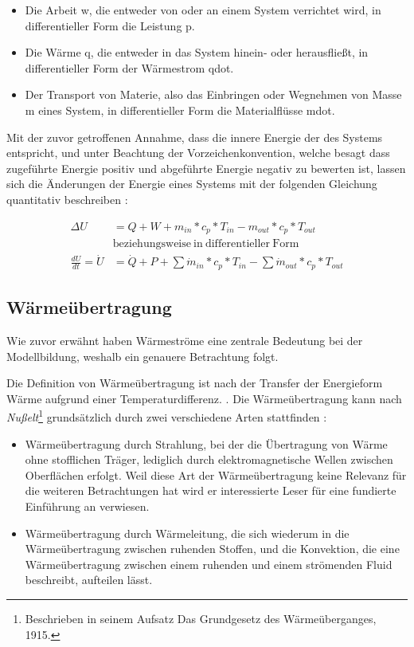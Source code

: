 \begin{itemize}
	\item Die Arbeit \gls{w}, die entweder von oder an einem System verrichtet wird, in differentieller Form die Leistung \gls{p}.
	\item Die Wärme \gls{q}, die entweder in das System hinein- oder herausfließt, in differentieller Form der Wärmestrom \gls{qdot}.
	\item Der Transport von Materie, also das Einbringen oder Wegnehmen von Masse \gls{m} eines System, in differentieller Form die Materialflüsse \gls{mdot}.
\end{itemize}

Mit der zuvor getroffenen Annahme, dass die innere Energie der des Systems entspricht, und unter Beachtung der Vorzeichenkonvention, welche besagt dass zugeführte Energie positiv und abgeführte Energie negativ zu bewerten ist, lassen sich die Änderungen der Energie eines Systems mit der folgenden Gleichung quantitativ beschreiben \cite[S.~54]{ba12}:

\begin{equation}
\label{eq:hauptsatz}
\begin{split}
\Delta U & = Q + W + m_{in}*c_{p}*T_{in}-m_{out}*c_{p}*T_{out} \\ ~& \mathrm{beziehungsweise~in~differentieller~Form}\\
\frac{dU}{dt}=\dot{U} & =\dot{Q}+P+\sum\dot{m}_{in}*c_{p}*T_{in}-\sum\dot{m}_{out}*c_{p}*T_{out}
\end{split}
\end{equation}


\subsection{Wärmeübertragung}

Wie zuvor erwähnt haben Wärmeströme eine zentrale Bedeutung bei der Modellbildung, weshalb ein genauere Betrachtung folgt.

Die Definition von Wärmeübertragung ist nach \cite[S.~1]{bo14} \Gun [...] der Transfer der Energieform Wärme aufgrund einer Temperaturdifferenz. \Gun .
Die Wärmeübertragung kann nach \textit{Nußelt}\footnote{Beschrieben in seinem Aufsatz \Gun Das Grundgesetz des Wärmeüberganges\Gob , 1915.} grundsätzlich durch zwei verschiedene Arten stattfinden \cite[S.~3f.]{bo14}:

\begin{itemize}
	\item Wärmeübertragung durch Strahlung, bei der die Übertragung von Wärme ohne stofflichen Träger, lediglich durch elektromagnetische Wellen zwischen Oberflächen erfolgt. Weil diese Art der Wärmeübertragung keine Relevanz für die weiteren Betrachtungen hat wird er interessierte Leser für eine fundierte Einführung an \cite{bo14} verwiesen. 
	\item  Wärmeübertragung durch Wärmeleitung, die sich wiederum in die Wärmeübertragung zwischen ruhenden Stoffen, und die Konvektion, die eine Wärmeübertragung zwischen einem ruhenden und einem strömenden Fluid beschreibt, aufteilen lässt. 
\end{itemize}


